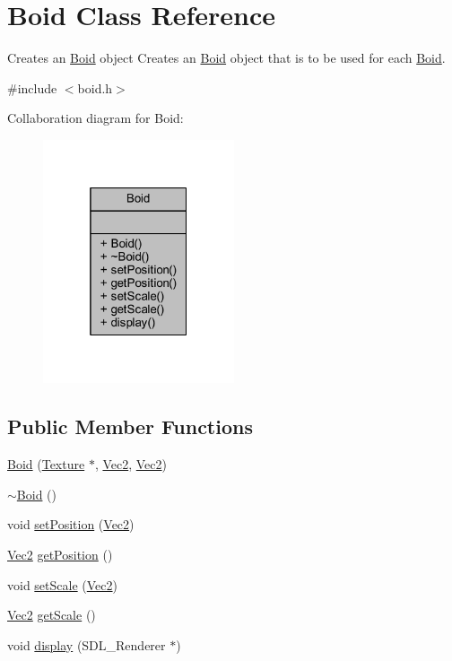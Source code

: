 \hypertarget{class_boid}{\section{Boid Class Reference}
\label{class_boid}
}


Creates an \hyperlink{class_boid}{Boid} object Creates an \hyperlink{class_boid}{Boid} object that is to be used for each \hyperlink{class_boid}{Boid}.  




{\ttfamily \#include $<$boid.\+h$>$}



Collaboration diagram for Boid\+:
\nopagebreak
\begin{figure}[H]
\begin{center}
\leavevmode
\includegraphics[width=160pt]{class_boid__coll__graph}
\end{center}
\end{figure}
\subsection*{Public Member Functions}
\begin{DoxyCompactItemize}
\item 
\hyperlink{class_boid_aa0c991f0bbe21209e22fcf81002dab11}{Boid} (\hyperlink{class_texture}{Texture} $\ast$, \hyperlink{struct_vec2}{Vec2}, \hyperlink{struct_vec2}{Vec2})
\item 
\hyperlink{class_boid_a712f84ddc1b8ad06ad7ecd6c10a1666c}{$\sim$\+Boid} ()
\item 
void \hyperlink{class_boid_a62ebe99b4a19edfc2d0a6f1ac58e9658}{set\+Position} (\hyperlink{struct_vec2}{Vec2})
\item 
\hyperlink{struct_vec2}{Vec2} \hyperlink{class_boid_a4f21bfa041637ffcce13c56764fd3c9f}{get\+Position} ()
\item 
void \hyperlink{class_boid_a4443fb5d1fb425b9fede21c3cee2ba84}{set\+Scale} (\hyperlink{struct_vec2}{Vec2})
\item 
\hyperlink{struct_vec2}{Vec2} \hyperlink{class_boid_a3a5d507c214ebd3bf9eda04e2157c4b5}{get\+Scale} ()
\item 
void \hyperlink{class_boid_ad522fbcf60e6e318c785ca7b04091472}{display} (S\+D\+L\+\_\+\+Renderer $\ast$)
\end{DoxyCompactItemize}



